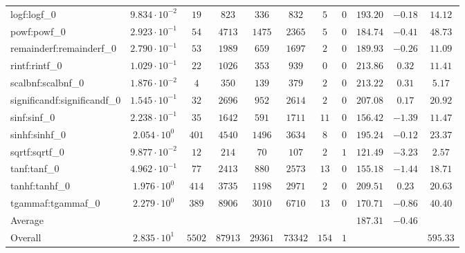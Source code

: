 \begin{tabular}{|l|c|c|c|c|c|c|c|c|c|c|}
logf:logf\_0                 & $ 9.834 \cdot 10^{-2} $ & $ 19     $ & $ 823   $ & $ 336   $ & $ 832   $ & $ 5   $ & $ 0 $ & $ 193.20      $ & $ -0.18   $ & $ 14.12   $ \\
powf:powf\_0                 & $ 2.923 \cdot 10^{-1} $ & $ 54     $ & $ 4713  $ & $ 1475  $ & $ 2365  $ & $ 5   $ & $ 0 $ & $ 184.74      $ & $ -0.41   $ & $ 48.73   $ \\
remainderf:remainderf\_0     & $ 2.790 \cdot 10^{-1} $ & $ 53     $ & $ 1989  $ & $ 659   $ & $ 1697  $ & $ 2   $ & $ 0 $ & $ 189.93      $ & $ -0.26   $ & $ 11.09   $ \\
rintf:rintf\_0               & $ 1.029 \cdot 10^{-1} $ & $ 22     $ & $ 1026  $ & $ 353   $ & $ 939   $ & $ 0   $ & $ 0 $ & $ 213.86      $ & $ 0.32    $ & $ 11.41   $ \\
scalbnf:scalbnf\_0           & $ 1.876 \cdot 10^{-2} $ & $ 4      $ & $ 350   $ & $ 139   $ & $ 379   $ & $ 2   $ & $ 0 $ & $ 213.22      $ & $ 0.31    $ & $ 5.17    $ \\
significandf:significandf\_0 & $ 1.545 \cdot 10^{-1} $ & $ 32     $ & $ 2696  $ & $ 952   $ & $ 2614  $ & $ 2   $ & $ 0 $ & $ 207.08      $ & $ 0.17    $ & $ 20.92   $ \\
sinf:sinf\_0                 & $ 2.238 \cdot 10^{-1} $ & $ 35     $ & $ 1642  $ & $ 591   $ & $ 1711  $ & $ 11  $ & $ 0 $ & $ 156.42      $ & $ -1.39   $ & $ 11.47   $ \\
sinhf:sinhf\_0               & $ 2.054 \cdot 10^{0}  $ & $ 401    $ & $ 4540  $ & $ 1496  $ & $ 3634  $ & $ 8   $ & $ 0 $ & $ 195.24      $ & $ -0.12   $ & $ 23.37   $ \\
sqrtf:sqrtf\_0               & $ 9.877 \cdot 10^{-2} $ & $ 12     $ & $ 214   $ & $ 70    $ & $ 107   $ & $ 2   $ & $ 1 $ & $ 121.49      $ & $ -3.23   $ & $ 2.57    $ \\
tanf:tanf\_0                 & $ 4.962 \cdot 10^{-1} $ & $ 77     $ & $ 2413  $ & $ 880   $ & $ 2573  $ & $ 13  $ & $ 0 $ & $ 155.18      $ & $ -1.44   $ & $ 18.71   $ \\
tanhf:tanhf\_0               & $ 1.976 \cdot 10^{0}  $ & $ 414    $ & $ 3735  $ & $ 1198  $ & $ 2971  $ & $ 2   $ & $ 0 $ & $ 209.51      $ & $ 0.23    $ & $ 20.63   $ \\
tgammaf:tgammaf\_0           & $ 2.279 \cdot 10^{0}  $ & $ 389    $ & $ 8906  $ & $ 3010  $ & $ 6710  $ & $ 13  $ & $ 0 $ & $ 170.71      $ & $ -0.86   $ & $ 40.40   $ \\
\hline
Average                      & $                     $ & $        $ & $       $ & $       $ & $       $ & $     $ & $   $ & $ 187.31      $ & $ -0.46   $ & $         $ \\
\hline
Overall                      & $ 2.835 \cdot 10^{1}  $ & $ 5502   $ & $ 87913 $ & $ 29361 $ & $ 73342 $ & $ 154 $ & $ 1 $ & $             $ & $         $ & $ 595.33  $ \\
\hline
\end{tabular}
